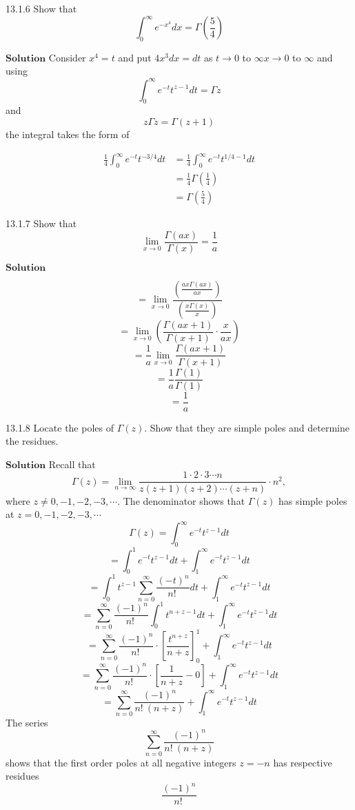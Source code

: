 \documentclass{article}
\begin{document}
\begin{flushleft}
\newpage

\begin{mybox}{13.1.6}
Show that
$$
\int_{0}^{\infty} e^{-x^{4}} d x=\Gamma\left(\frac{5}{4}\right)
$$
\end{mybox}

$\boxed{\textbf{Solution}}$ Consider $x^{4}=t$ and put $4x^3 dx = dt$ as $t \rightarrow 0$ to $\infty x \rightarrow 0$ to $\infty$ and using
$$
\int_{0}^{\infty} e^{-t} t^{z-1} d t=\Gamma z
$$
and
$$
z \Gamma z=\Gamma(z+1)
$$
the integral takes the form of

$$\begin{aligned} \frac{1}{4} \int_{0}^{\infty} e^{-t} t^{-3 / 4} d t &=\frac{1}{4} \int_{0}^{\infty} e^{-t} t^{1 / 4-1} d t \\ &=\frac{1}{4} \Gamma\left(\frac{1}{4}\right) \\ &=\Gamma\left(\frac{5}{4}\right) \end{aligned}$$

\newpage


\begin{mybox}{13.1.7}
Show that
$$
\lim _{x \rightarrow 0} \frac{\Gamma(a x)}{\Gamma(x)}=\frac{1}{a}
$$
\end{mybox}

$\boxed{\textbf{Solution}}$ 

$$=\lim _{x \rightarrow 0} \frac{\left(\frac{a x \Gamma(a x)}{a x}\right)}{\left(\frac{x \Gamma(x)}{x}\right)}$$
$$=\lim _{x \rightarrow 0}\left(\frac{\Gamma(a x+1)}{\Gamma(x+1)} \cdot \frac{x}{a x}\right)$$
$$=\frac{1}{a} \lim _{x \rightarrow 0} \frac{\Gamma(a x+1)}{\Gamma(x+1)}$$
$$=\frac{1}{a} \frac{\Gamma(1)}{\Gamma(1)}$$
$$=\frac{1}{a}$$

\newpage


\begin{mybox}{13.1.8}
Locate the poles of $\Gamma(z)$. Show that they are simple poles and determine the residues.
\end{mybox}
$\boxed{\textbf{Solution}}$
Recall that 
$$\Gamma(z)=\lim _{n \rightarrow \infty} \frac{1 \cdot 2 \cdot 3  \cdots  n}{z(z+1)(z+2) \cdots(z+n)} \cdot n^{2},$$ where $z \neq 0,-1,-2,-3, \cdots$. The denominator shows that $\Gamma(z)$ has simple poles at $z=0,-1,-2,-3, \cdots$
$$\Gamma(z)=\int_{0}^{\infty} e^{-t} t^{z-1} d t$$
$$=\int_{0}^{1} e^{-t} t^{z-1} d t+\int_{1}^{\infty} e^{-t} t^{z-1} d t$$
$$=\int_{0}^{1} t^{z-1} \sum_{n=0}^{\infty} \frac{(-t)^{n}}{n! \ } d t+\int_{1}^{\infty} e^{-t} t^{z-1} d t$$
$$=\sum_{n=0}^{\infty} \frac{(-1)^{n}}{n! \ } \int_{0}^{1} t^{n+z-1} d t+\int_{1}^{\infty} e^{-t} t^{z-1} d t$$
$$=\sum_{n=0}^{\infty} \frac{(-1)^{n}}{n! \ } \cdot\left[\frac{t^{n+z}}{n+z}\right]_{0}^{1}+\int_{1}^{\infty} e^{-t} t^{z-1} d t$$
$$=\sum_{n=0}^{\infty} \frac{(-1)^{n}}{n! \ } \cdot\left[\frac{1}{n+z}-0\right]+\int_{1}^{\infty} e^{-t} t^{z-1} d t$$
$$=\sum_{n=0}^{\infty} \frac{(-1)^{n}}{n! \ (n+z)}+\int_{1}^{\infty} e^{-t} t^{z-1} d t$$
The series 
$$\sum_{n=0}^{\infty} \frac{(-1)^{n}}{n! \ (n+z)}$$ 
shows that the first order poles at all negative integers $z=-n$ has respective residues 
$$\frac{(-1)^{n}}{n! \ }$$


\end{flushleft}
\end{document}
